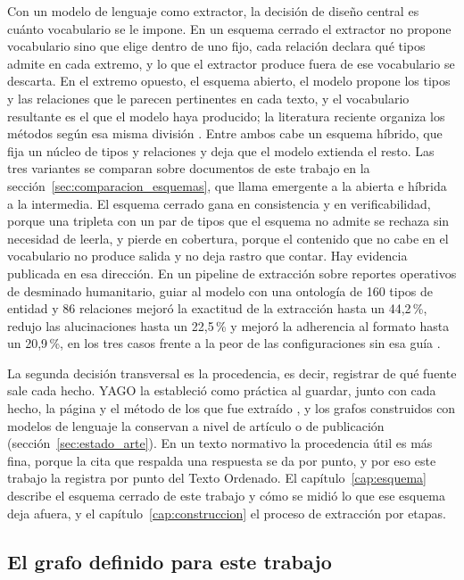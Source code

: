\documentclass[12pt,a4paper]{report}
\begin{document}
Con un modelo de lenguaje como extractor, la decisión de diseño central es cuánto vocabulario se le impone. En un esquema cerrado el extractor no propone vocabulario sino que elige dentro de uno fijo, cada relación declara qué tipos admite en cada extremo, y lo que el extractor produce fuera de ese vocabulario se descarta. En el extremo opuesto, el esquema abierto, el modelo propone los tipos y las relaciones que le parecen pertinentes en cada texto, y el vocabulario resultante es el que el modelo haya producido; la literatura reciente organiza los métodos según esa misma división \cite{bian2025survey}. Entre ambos cabe un esquema híbrido, que fija un núcleo de tipos y relaciones y deja que el modelo extienda el resto. Las tres variantes se comparan sobre documentos de este trabajo en la sección~\ref{sec:comparacion_esquemas}, que llama emergente a la abierta e híbrida a la intermedia. El esquema cerrado gana en consistencia y en verificabilidad, porque una tripleta con un par de tipos que el esquema no admite se rechaza sin necesidad de leerla, y pierde en cobertura, porque el contenido que no cabe en el vocabulario no produce salida y no deja rastro que contar. Hay evidencia publicada en esa dirección. En un pipeline de extracción sobre reportes operativos de desminado humanitario, guiar al modelo con una ontología de 160 tipos de entidad y 86 relaciones mejoró la exactitud de la extracción hasta un 44,2\,\%, redujo las alucinaciones hasta un 22,5\,\% y mejoró la adherencia al formato hasta un 20,9\,\%, en los tres casos frente a la peor de las configuraciones sin esa guía \cite{zhou2025textminex}.

La segunda decisión transversal es la procedencia, es decir, registrar de qué fuente sale cada hecho. YAGO la estableció como práctica al guardar, junto con cada hecho, la página y el método de los que fue extraído \cite{suchanek2007yago}, y los grafos construidos con modelos de lenguaje la conservan a nivel de artículo o de publicación (sección~\ref{sec:estado_arte}). En un texto normativo la procedencia útil es más fina, porque la cita que respalda una respuesta se da por punto, y por eso este trabajo la registra por punto del Texto Ordenado. El capítulo~\ref{cap:esquema} describe el esquema cerrado de este trabajo y cómo se midió lo que ese esquema deja afuera, y el capítulo~\ref{cap:construccion} el proceso de extracción por etapas.

\subsection{El grafo definido para este trabajo}
\label{sec:mt_kg_def}
\end{document}
